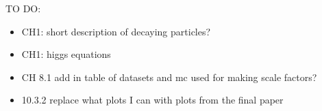 \documentclass[12pt,chapterheads,oneside]{ucsd}
\begin{document}
\graphicspath{
{Figs/}
}



TO DO:\\
\begin{itemize}
\item CH1: short description of decaying particles?
\item CH1: higgs equations
\item CH 8.1 add in table of datasets and mc used for making scale factors?
\item 10.3.2 replace what plots I can with plots from the final paper
\end{itemize}










	








   






\appendix


\end{document}
